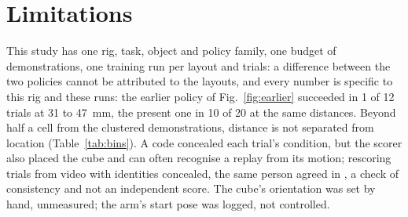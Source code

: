 \section{Limitations}
\label{sec:limits}

This study has one rig, task, object and policy family, one budget of \nDemos demonstrations, one training run per layout and \nTrialsTotal trials: a difference between the two policies cannot be attributed to the layouts, and every number is specific to this rig and these runs: the earlier policy of Fig.~\ref{fig:earlier} succeeded in 1 of 12 trials at 31 to 47~mm, the present one in 10 of 20 at the same distances. %
Beyond half a cell from the clustered demonstrations, distance is not separated from location (Table~\ref{tab:bins}).
A code concealed each trial's condition, but the scorer also placed the cube and can often recognise a replay from its motion; rescoring \nSecondScored trials from video with identities concealed, the same person agreed in \nSecondScoredAgree, a check of consistency and not an independent score.
The cube's orientation was set by hand, unmeasured; the arm's start pose was logged, not controlled.
